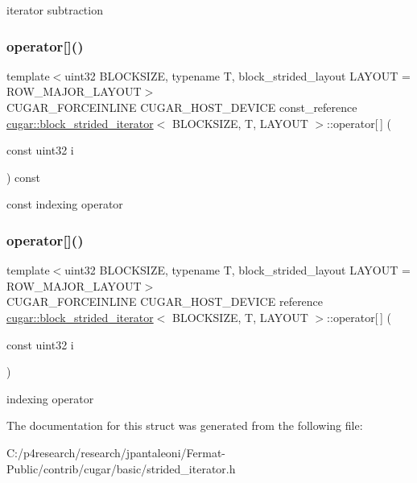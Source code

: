 iterator subtraction \mbox{\label{structcugar_1_1block__strided__iterator_a54df5dbe31b4bff8a60e7b42bcc51f7a}} 
\subsubsection{\texorpdfstring{operator[]()}{operator[]()}\hspace{0.1cm}{\footnotesize\ttfamily [1/2]}}
{\footnotesize\ttfamily template$<$uint32 B\+L\+O\+C\+K\+S\+I\+ZE, typename T, block\+\_\+strided\+\_\+layout L\+A\+Y\+O\+UT = R\+O\+W\+\_\+\+M\+A\+J\+O\+R\+\_\+\+L\+A\+Y\+O\+UT$>$ \\
C\+U\+G\+A\+R\+\_\+\+F\+O\+R\+C\+E\+I\+N\+L\+I\+NE C\+U\+G\+A\+R\+\_\+\+H\+O\+S\+T\+\_\+\+D\+E\+V\+I\+CE const\+\_\+reference \hyperlink{structcugar_1_1block__strided__iterator}{cugar\+::block\+\_\+strided\+\_\+iterator}$<$ B\+L\+O\+C\+K\+S\+I\+ZE, T, L\+A\+Y\+O\+UT $>$\+::operator\mbox{[}$\,$\mbox{]} (\begin{DoxyParamCaption}\item[{const uint32}]{i }\end{DoxyParamCaption}) const\hspace{0.3cm}{\ttfamily [inline]}}

const indexing operator \mbox{\label{structcugar_1_1block__strided__iterator_ad652cb1f0468692a7145d113b749a525}} 
\subsubsection{\texorpdfstring{operator[]()}{operator[]()}\hspace{0.1cm}{\footnotesize\ttfamily [2/2]}}
{\footnotesize\ttfamily template$<$uint32 B\+L\+O\+C\+K\+S\+I\+ZE, typename T, block\+\_\+strided\+\_\+layout L\+A\+Y\+O\+UT = R\+O\+W\+\_\+\+M\+A\+J\+O\+R\+\_\+\+L\+A\+Y\+O\+UT$>$ \\
C\+U\+G\+A\+R\+\_\+\+F\+O\+R\+C\+E\+I\+N\+L\+I\+NE C\+U\+G\+A\+R\+\_\+\+H\+O\+S\+T\+\_\+\+D\+E\+V\+I\+CE reference \hyperlink{structcugar_1_1block__strided__iterator}{cugar\+::block\+\_\+strided\+\_\+iterator}$<$ B\+L\+O\+C\+K\+S\+I\+ZE, T, L\+A\+Y\+O\+UT $>$\+::operator\mbox{[}$\,$\mbox{]} (\begin{DoxyParamCaption}\item[{const uint32}]{i }\end{DoxyParamCaption})\hspace{0.3cm}{\ttfamily [inline]}}

indexing operator 

The documentation for this struct was generated from the following file\+:\begin{DoxyCompactItemize}
\item 
C\+:/p4research/research/jpantaleoni/\+Fermat-\/\+Public/contrib/cugar/basic/strided\+\_\+iterator.\+h\end{DoxyCompactItemize}
